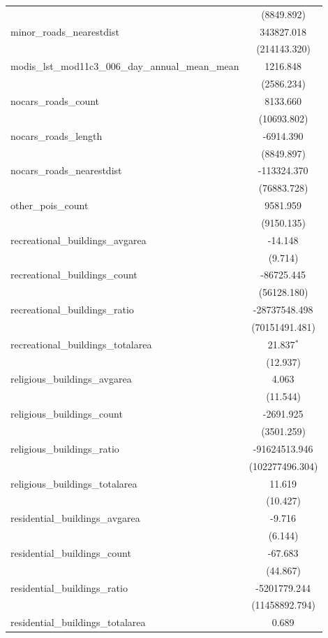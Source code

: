 \begin{table}[!htbp]
\begin{tabular}{@{\extracolsep{5pt}}lc}
  & (8849.892) \\
 minor_roads_nearestdist & 343827.018$^{}$ \\
  & (214143.320) \\
 modis_lst_mod11c3_006_day_annual_mean_mean & 1216.848$^{}$ \\
  & (2586.234) \\
 nocars_roads_count & 8133.660$^{}$ \\
  & (10693.802) \\
 nocars_roads_length & -6914.390$^{}$ \\
  & (8849.897) \\
 nocars_roads_nearestdist & -113324.370$^{}$ \\
  & (76883.728) \\
 other_pois_count & 9581.959$^{}$ \\
  & (9150.135) \\
 recreational_buildings_avgarea & -14.148$^{}$ \\
  & (9.714) \\
 recreational_buildings_count & -86725.445$^{}$ \\
  & (56128.180) \\
 recreational_buildings_ratio & -28737548.498$^{}$ \\
  & (70151491.481) \\
 recreational_buildings_totalarea & 21.837$^{*}$ \\
  & (12.937) \\
 religious_buildings_avgarea & 4.063$^{}$ \\
  & (11.544) \\
 religious_buildings_count & -2691.925$^{}$ \\
  & (3501.259) \\
 religious_buildings_ratio & -91624513.946$^{}$ \\
  & (102277496.304) \\
 religious_buildings_totalarea & 11.619$^{}$ \\
  & (10.427) \\
 residential_buildings_avgarea & -9.716$^{}$ \\
  & (6.144) \\
 residential_buildings_count & -67.683$^{}$ \\
  & (44.867) \\
 residential_buildings_ratio & -5201779.244$^{}$ \\
  & (11458892.794) \\
 residential_buildings_totalarea & 0.689$^{}$ \\

\end{tabular}
\end{table}
